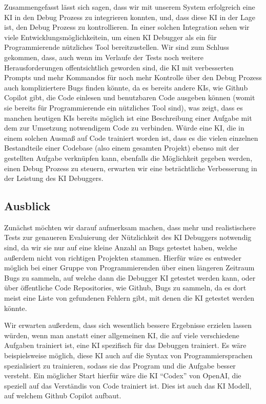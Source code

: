 \documentclass[a4paper,12pt,ngerman]{scrartcl}
\begin{document}
Zusammengefasst lässt sich sagen, dass wir mit unserem System erfolgreich eine KI in den Debug Prozess zu integrieren konnten, und, dass diese KI in der Lage ist, den Debug Prozess zu kontrollieren. In einer solchen Integration sehen wir viele Entwicklungsmöglichkeitein, um einen KI Debugger als ein für Programmierende nützliches Tool bereitzustellen. Wir sind zum Schluss gekommen, dass, auch wenn im Verlaufe der Tests noch weitere Herausforderungen offentsichtlich geworden sind, die KI mit verbesserten Prompts und mehr Kommandos für noch mehr Kontrolle über den Debug Prozess auch kompliziertere Bugs finden könnte, da es bereits andere KIs, wie Github Copilot gibt, die Code einlesen und benutzbaren Code ausgeben können (womit sie bereits für Programmierende ein nützliches Tool sind), was zeigt, dass es manchen heutigen KIs bereits möglich ist eine Beschreibung einer Aufgabe mit dem zur Umsetzung notwendigem Code zu verbinden. Würde eine KI, die in einem solchen Ausmaß auf Code trainiert worden ist, dass es die vielen einzelnen Bestandteile einer Codebase (also einem gesamten Projekt) ebenso mit der gestellten Aufgabe verknüpfen kann, ebenfalls die Möglichkeit gegeben werden, einen Debug Prozess zu steuern, erwarten wir eine beträchtliche Verbesserung in der Leistung des KI Debuggers.

\subsection{Ausblick}

Zunächst möchten wir darauf aufmerksam machen, dass mehr und realistischere Tests zur genaueren Evaluierung der Nützlichkeit des KI Debuggers notwendig sind, da wir sie nur auf eine kleine Anzahl an Bugs getestet haben, welche außerdem nicht von richtigen Projekten stammen. Hierfür wäre es entweder möglich bei einer Gruppe von Programmierenden über einen längeren Zeitraum Bugs zu sammeln, auf welche dann die Debugger KI getestet werden kann, oder über öffentliche Code Repositories, wie Github, Bugs zu sammeln, da es dort meist eine Liste von gefundenen Fehlern gibt, mit denen die KI getestet werden könnte.

Wir erwarten außerdem, dass sich wesentlich bessere Ergebnisse erzielen lassen würden, wenn man anstatt einer allgemeinen KI, die auf viele verschiedene Aufgaben trainiert ist, eine KI spezifisch für das Debuggen trainiert. Es wäre beispielsweise möglich, diese KI auch auf die Syntax von Programmiersprachen spezialisiert zu trainieren, sodass sie das Program und die Aufgabe besser versteht. Ein möglicher Start hierfür wäre die KI ``Codex'' von OpenAI, die speziell auf das Verständis von Code trainiert ist. Dies ist auch das KI Modell, auf welchem Github Copilot aufbaut.
\end{document}
